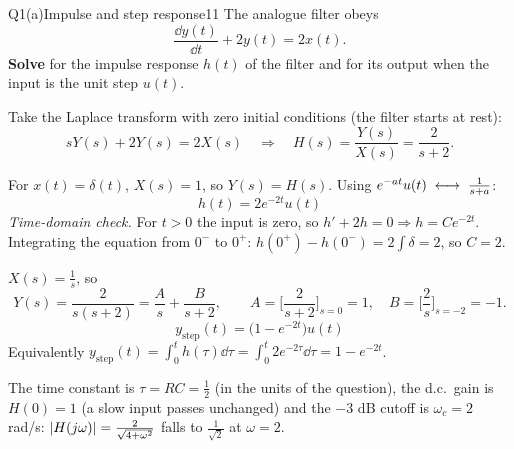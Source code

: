 \begin{qcard}{Q1(a)}{Impulse and step response}{11}
The analogue filter obeys
\[\frac{\dd y(t)}{\dd t}+2y(t)=2x(t).\]
\textbf{Solve} for the impulse response $h(t)$ of the filter and for its output when the input is the unit step $u(t)$.
\end{qcard}
\begin{solution}
 Take the Laplace transform with zero initial conditions (the filter starts at rest):
\[sY(s)+2Y(s)=2X(s)\quad\Longrightarrow\quad H(s)=\frac{Y(s)}{X(s)}=\frac{2}{s+2}.\]

 For $x(t)=\delta(t)$, $X(s)=1$, so $Y(s)=H(s)$. Using $e^{-at}u(t)\;\longleftrightarrow\;\frac1{s+a}$:
\[\boxed{h(t)=2e^{-2t}u(t)}\]
\emph{Time-domain check.} For $t>0$ the input is zero, so $h'+2h=0\Rightarrow h=Ce^{-2t}$. Integrating the equation from $0^-$ to $0^+$: $h(0^+)-h(0^-)=2\int\delta=2$, so $C=2$. \checkmark

 $X(s)=\frac1s$, so
\[Y(s)=\frac{2}{s(s+2)}=\frac{A}{s}+\frac{B}{s+2},\qquad A=\Big[\frac2{s+2}\Big]_{s=0}=1,\quad B=\Big[\frac2s\Big]_{s=-2}=-1 .\]
\[\boxed{y_{\text{step}}(t)=\big(1-e^{-2t}\big)u(t)}\]
Equivalently $y_{\text{step}}(t)=\int_0^th(\tau)\dd\tau=\int_0^t2e^{-2\tau}\dd\tau=1-e^{-2t}$.

 The time constant is $\tau=RC=\frac12$ (in the units of the question), the d.c.\ gain is $H(0)=1$ (a slow input passes unchanged) and the $-3$ dB cutoff is $\omega_c=2$ rad/s: $\lvert H(j\omega)\rvert=\frac{2}{\sqrt{4+\omega^2}}$ falls to $\frac1{\sqrt2}$ at $\omega=2$.
\begin{center}
\end{center}
\end{solution}

